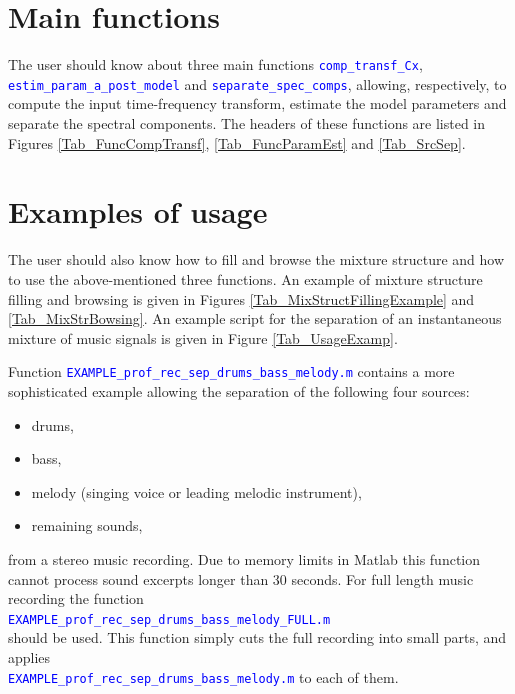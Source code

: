 \documentclass{article}
\newcommand{\matlabcolor}{blue}
\newcommand{\matvar}[1]{\textcolor{\matlabcolor}{\tt {#1}}}
\begin{document}
\section{Main functions}
\label{Sec_MainFunc}

The user should know about three main functions \matvar{comp\_transf\_Cx}, \matvar{estim\_param\_a\_post\_model} and \matvar{separate\_spec\_comps}, allowing, respectively, to compute the input time-frequency transform, estimate the model parameters and separate the spectral components. The headers of these functions are listed in Figures \ref{Tab_FuncCompTransf}, \ref{Tab_FuncParamEst} and \ref{Tab_SrcSep}.

\section{Examples of usage}
\label{Sec_UsageExample}

The user should also know how to fill and browse the mixture structure and how to use the above-mentioned three functions.
An example of mixture structure filling and browsing is given in Figures \ref{Tab_MixStructFillingExample} and \ref{Tab_MixStrBowsing}.
An example script
for the separation of an instantaneous mixture of music signals is given in Figure \ref{Tab_UsageExamp}.

Function \matvar{EXAMPLE\_prof\_rec\_sep\_drums\_bass\_melody.m} contains a more sophisticated example allowing the separation of the following four sources:
\begin{itemize}
\item drums,
\item bass,
\item melody (singing voice or leading melodic instrument),
\item remaining sounds,
\end{itemize}
from a stereo music recording.
Due to memory limits in Matlab this function cannot process sound excerpts longer than 30 seconds.
For full length music recording the function \\
\matvar{EXAMPLE\_prof\_rec\_sep\_drums\_bass\_melody\_FULL.m} \\
should be used.
This function simply cuts the full recording into small parts, and applies \\
\matvar{EXAMPLE\_prof\_rec\_sep\_drums\_bass\_melody.m} to each of them.
\end{document}

